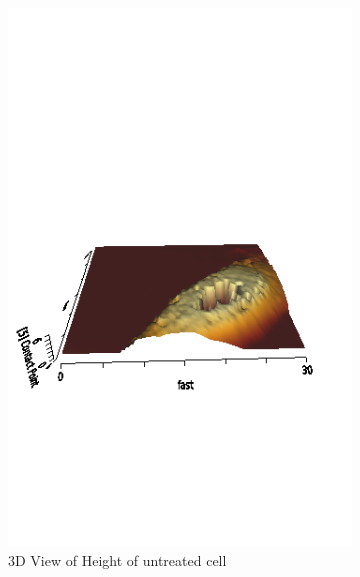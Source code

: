 \documentclass[a4paper,english,12pt,bibliography=totoc]{scrreprt}
\begin{document}
\begin{figure}[H]
    \begin{subfigure}{0.45\textwidth}
        \centering
        \includegraphics[width=\textwidth]{untreated/map.png}
        \caption{3D View of Height of untreated cell}
        \label{fig:ym_untreated}
    \end{subfigure}
    \begin{subfigure}{0.45\textwidth}
        \centering

\end{subfigure}
\end{figure}
\end{document}
